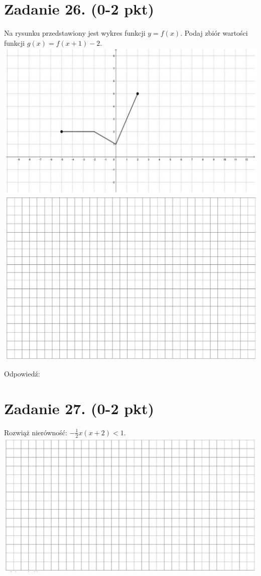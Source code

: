 \documentclass[10pt]{article}
\begin{document}
\section*{Zadanie 26. (0-2 pkt)}
Na rysunku przedstawiony jest wykres funkcji \(y=f(x)\). Podaj zbiór wartości funkcji \(g(x)=f(x+1)-2\).\\
\includegraphics[max width=\textwidth, center]{2024_11_21_832f1bc2b626663f1df2g-10(1)}\\
\includegraphics[max width=\textwidth, center]{2024_11_21_832f1bc2b626663f1df2g-10}

Odpowiedź:

\section*{Zadanie 27. (0-2 pkt)}
Rozwiąż nierówność: \(-\frac{1}{2} x(x+2)<1\).\\
\includegraphics[max width=\textwidth, center]{2024_11_21_832f1bc2b626663f1df2g-11(4)}
\end{document}
